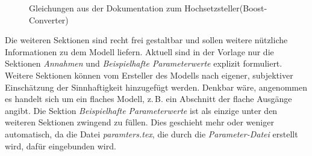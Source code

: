 \begin{figure}[h]
	\centering
	\caption{Gleichungen aus der Dokumentation zum Hochsetzsteller(Boost-Converter)\protect\footnotemark}
	\label{fig:BspDok_ModelEquations}
\end{figure}
%
Die weiteren Sektionen sind recht frei gestaltbar und sollen weitere nützliche Informationen zu dem Modell liefern. Aktuell sind in der Vorlage nur die Sektionen \textit{Annahmen} und \textit{Beispielhafte Parameterwerte} explizit formuliert. Weitere Sektionen können vom Ersteller des Modells nach eigener, subjektiver Einschätzung der Sinnhaftigkeit hinzugefügt werden. Denkbar wäre, angenommen es handelt sich um ein flaches Modell, z.\,B. ein Abschnitt der flache Ausgänge angibt. Die Sektion \textit{Beispielhafte Parameterwerte} ist als einzige unter den weiteren Sektionen zwingend zu füllen. Dies geschieht mehr oder weniger automatisch, da die Datei \textit{paramters.tex}, die durch die \textit{Parameter-Datei} erstellt wird, dafür eingebunden wird.


